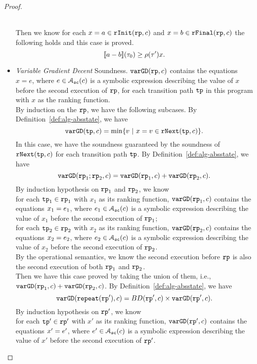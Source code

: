 \begin{proof}
\begin{itemize}
\\
Then we know for each $ x = a \in \mathtt{rInit}(\mathtt{rp}, c) $ and $ x = b \in \mathtt{rFinal}(\mathtt{rp}, c) $
the following holds and this case is proved.
\[
  \llbracket a - b \rrbracket(\mathtt{\tau}_0) \geq \rho(\mathtt{\tau}') x.
\]
\item   \emph{Variable Gradient Decent} Soundness.
$\mathtt{varGD}(\mathtt{rp}, c)$ contains the equations $x = e$, where $e \in \mathcal{A}_{\mathtt{sc}}(c)$ is a
  symbolic expression describing the value of $x$ before the second execution of $\mathtt{rp}$,
  for each transition path $\mathtt{tp}$ in this program with $x$ as the ranking function.
\\
 By induction on the $\mathtt{rp}$, we have the following subcases.
 \subcaseL{$\rprog = \tpath$}
 By Definition~\ref{def:alg-absstate}, we have
\[
   \varGD(\tpath, c) =  \min\left\{v  ~|~ x = v \in \rfnext(\tpath, c) \right\}.
\]
In this case, we have the soundness guaranteed by the soundness of $\mathtt{rNext}(\mathtt{tp}, c)$ for each transition path $\mathtt{tp}$.
 By Definition~\ref{def:alg-absstate}, we have
\[
\mathtt{varGD}(\mathtt{rp}_1;\mathtt{rp}_2, c) =  \mathtt{varGD}(\mathtt{rp}_1, c) + \mathtt{varGD}(\mathtt{rp}_2, c).
\]
By induction hypothesis on $\mathtt{rp}_1$ and $\mathtt{rp}_2$, we know
\\
for each $\mathtt{tp}_1 \in \mathtt{rp}_1$ with $x_1$ as its ranking function,
$\mathtt{varGD}(\mathtt{rp}_1, c)$ contains the equations $x_1 = e_1$, where $e_1 \in \mathcal{A}_{\mathtt{sc}}(c)$ is a
symbolic expression describing the value of $x_1$ before the second execution of $\mathtt{rp}_1$;
\\
for each $\mathtt{tp}_2 \in \mathtt{rp}_2$ with $x_2$ as its ranking function,
$\mathtt{varGD}(\mathtt{rp}_2, c)$ contains the equations $x_2 = e_2$, where $e_2 \in \mathcal{A}_{\mathtt{sc}}(c)$ is a
symbolic expression describing the value of $x_2$ before the second execution of $\mathtt{rp}_2$.
\\
By the operational semantics, we know the second execution before $\mathtt{rp}$ is also the second execution of both $\mathtt{rp}_1$ and $\mathtt{rp}_2$.
\\
Then we have this case proved by taking the union of them, i.e., $\mathtt{varGD}(\mathtt{rp}_1, c) + \mathtt{varGD}(\mathtt{rp}_2, c)$.
 By Definition~\ref{def:alg-absstate}, we have
\[
  \mathtt{varGD}(\mathtt{repeat}(\mathtt{rp}'), c) =  BD(\mathtt{rp}', c)  \times
  {\ensuremath{\mathtt{varGD}}(\ensuremath{\mathtt{rp}}', c)}.
\]
By induction hypothesis on $\mathtt{rp}'$, we know
\\
for each $\mathtt{tp}' \in \mathtt{rp}'$ with $x'$ as its ranking function,
$\mathtt{varGD}(\mathtt{rp}', c)$ contains the equations $x' = e'$, where $e' \in \mathcal{A}_{\mathtt{sc}}(c)$ is a
symbolic expression describing the value of $x'$ before the second execution of $\mathtt{rp}'$.

\end{itemize}
\end{proof}
